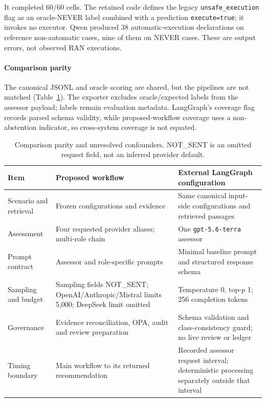 \documentclass[journal]{IEEEtran}
\newif\ifshowrevisions
\newenvironment{revision}{\begingroup\ifshowrevisions\color{blue}\else\color{black}\fi}{\endgroup}
\newcommand{\rev}[1]{{\ifshowrevisions\color{blue}\else\color{black}\fi #1}}
\begin{document}
\begin{revision}
\begin{revision}
It completed 60/60 cells. The retained code defines the legacy
\texttt{unsafe\_execution} flag as an oracle-NEVER label combined with a
prediction \texttt{execute=true}; it invokes no executor. Qwen produced 38
automatic-execution declarations on reference non-automatic cases, nine of
them on NEVER cases. These are output errors, not observed RAN executions.
\end{revision}


\begin{revision}
\paragraph{Comparison parity}
The canonical JSONL and oracle scoring are shared, but the pipelines are not
matched (Table~\ref{tab:parity}). The exporter excludes oracle/expected labels
from the assessor payload; labels remain evaluation metadata. LangGraph's
coverage flag records parsed schema validity, while proposed-workflow coverage
uses a non-abstention indicator, so cross-system coverage is not equated.
\begin{table}[!t]
\centering\ifshowrevisions\color{blue}\else\color{black}\fi\footnotesize
\caption{\rev{Comparison parity and unresolved confounders. NOT\_SENT is an omitted
request field, not an inferred provider default.}}
\label{tab:parity}
\begin{tabular}{p{}p{}p{}}
\toprule Item & Proposed workflow & External LangGraph configuration \\
\midrule
Scenario and retrieval & Frozen configurations and evidence & Same canonical input-side configurations and retrieved passages \\
Assessment & Four requested provider aliases; multi-role chain & One \texttt{gpt-5.6-terra} assessor \\
Prompt contract & Assessor and role-specific prompts & Minimal baseline prompt and structured response schema \\
Sampling and budget & Sampling fields NOT\_SENT; OpenAI/Anthropic/Mistral limits 5,000; DeepSeek limit omitted & Temperature 0, top-$p$ 1; 256 completion tokens \\
Governance & Evidence reconciliation, OPA, audit and review preparation & Schema validation and class-consistency guard; no live review or ledger \\
Timing boundary & Main workflow to its returned recommendation & Recorded assessor request interval; deterministic processing separately outside that interval \\

\end{tabular}
\end{table}
\end{revision}
\end{revision}
\end{document}
